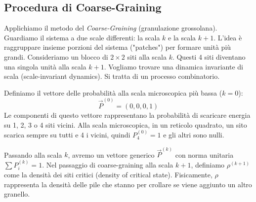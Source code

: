 \subsection{Procedura di Coarse-Graining}
Applichiamo il metodo del \textit{Coarse-Graining} (granulazione grossolana). Guardiamo il sistema a due scale differenti: la scala $k$ e la scala $k+1$.
L'idea è raggruppare insieme porzioni del sistema ("patches") per formare unità più grandi. Consideriamo un blocco di $2 \times 2$ siti alla scala $k$. Questi 4 siti diventano una singola unità alla scala $k+1$. Vogliamo trovare una dinamica invariante di scala (scale-invariant dynamics).
Si tratta di un processo combinatorio.

Definiamo il vettore delle probabilità alla scala microscopica più bassa ($k=0$):
\begin{equation}
    \vec{P}^{(0)} = (0, 0, 0, 1)
\end{equation}
Le componenti di questo vettore rappresentano la probabilità di scaricare energia su 1, 2, 3 o 4 siti vicini. Alla scala microscopica, in un reticolo quadrato, un sito scarica sempre su tutti e 4 i vicini, quindi $P_4^{(0)} = 1$ e gli altri sono nulli.

Passando alla scala $k$, avremo un vettore generico $\vec{P}^{(k)}$ con norma unitaria $\sum P_i^{(k)} = 1$.
Nel passaggio di coarse-graining alla scala $k+1$, definiamo $\rho^{(k+1)}$ come la densità dei siti critici (density of critical state).
Fisicamente, $\rho$ rappresenta la densità delle pile che stanno per crollare se viene aggiunto un altro granello.

